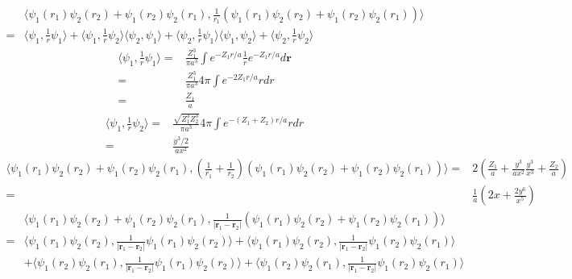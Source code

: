 \begin{align*}
    &\langle \psi_1(r_1)\psi_2(r_2)
    +\psi_1(r_2)\psi_2(r_1),
    \frac{1}{r_1}
    (\psi_1(r_1)\psi_2(r_2)
    +\psi_1(r_2)\psi_2(r_1))
    \rangle\\
    =&
    \langle\psi_1,\frac{1}{r}\psi_1\rangle
    +\langle\psi_1,\frac{1}{r}\psi_2\rangle
    \langle\psi_2,\psi_1\rangle+
\langle\psi_2,\frac{1}{r}\psi_1\rangle
\langle\psi_1,\psi_2\rangle
+    \langle\psi_2,\frac{1}{r}\psi_2\rangle
\end{align*}
\begin{align*}
    \langle\psi_1,\frac{1}{r}\psi_1\rangle
    =&
    \frac{Z_1^3}{\pi a^3}
    \int e^{-Z_1r/a}
    \frac{1}{r} e^{-Z_1r/a}d\bm r\\
    =&
    \frac{Z_1^3}{\pi a^3}4\pi
    \int e^{-2Z_1r/a}
    rdr\\
    =&\frac{Z_1}{a}
\end{align*}
\begin{align*}
    \langle\psi_1,\frac{1}{r}\psi_2\rangle=&
    \frac{\sqrt{Z_1^3Z_2^3}}{\pi a^3}4\pi
    \int e^{-(Z_1+Z_2)r/a}rdr\\
    =&
    \frac{y^3/2}{ax^2}
\end{align*}
\begin{align*}
    \langle \psi_1(r_1)\psi_2(r_2)
    +\psi_1(r_2)\psi_2(r_1),
    (\frac{1}{r_1}+
    \frac{1}{r_2})
    (\psi_1(r_1)\psi_2(r_2)
    +\psi_1(r_2)\psi_2(r_1))
    \rangle=&
    2\left(
    \frac{Z_1}{a}
    +\frac{y^3}{ax^2}\frac{y^3}{x^3}
    +\frac{Z_2}{a}
    \right)\\
    =&\frac{1}{a}\left(
    2x + \frac{2y^6}{x^5}
    \right)
\end{align*}
\begin{align*}
    &\langle \psi_1(r_1)\psi_2(r_2)
    +\psi_1(r_2)\psi_2(r_1),
    \frac{1}{|\bm r_1-\bm r_2|}
    (\psi_1(r_1)\psi_2(r_2)
    +\psi_1(r_2)\psi_2(r_1))
    \rangle\\
    =&
    \langle
    \psi_1(r_1)\psi_2(r_2),
    \frac{1}{|\bm r_1-\bm r_2|}
    \psi_1(r_1)\psi_2(r_2)
    \rangle
    +\langle
    \psi_1(r_1)\psi_2(r_2),
    \frac{1}{|\bm r_1-\bm r_2|}
    \psi_1(r_2)\psi_2(r_1)
    \rangle\\
    &
    +\langle
    \psi_1(r_2)\psi_2(r_1),
    \frac{1}{|\bm r_1-\bm r_2|}
    \psi_1(r_1)\psi_2(r_2)
    \rangle+
    \langle
    \psi_1(r_2)\psi_2(r_1),
    \frac{1}{|\bm r_1-\bm r_2|}
    \psi_1(r_2)\psi_2(r_1)
    \rangle
\end{align*}
